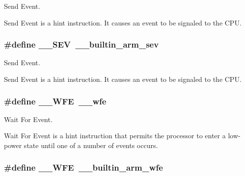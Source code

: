Send Event. 

Send Event is a hint instruction. It causes an event to be signaled to the C\-P\-U. \hypertarget{group___c_m_s_i_s___core___instruction_interface_gaab4f296d0022b4b10dc0976eb22052f9}{
\subsubsection[{\-\_\-\-\_\-\-S\-E\-V}]{\setlength{\rightskip}{0pt plus 5cm}\#define \-\_\-\-\_\-\-S\-E\-V~\-\_\-\-\_\-builtin\-\_\-arm\-\_\-sev}}\label{group___c_m_s_i_s___core___instruction_interface_gaab4f296d0022b4b10dc0976eb22052f9}


Send Event. 

Send Event is a hint instruction. It causes an event to be signaled to the C\-P\-U. \hypertarget{group___c_m_s_i_s___core___instruction_interface_gaac6cc7dd4325d9cb40d3290fa5244b3d}{
\subsubsection[{\-\_\-\-\_\-\-W\-F\-E}]{\setlength{\rightskip}{0pt plus 5cm}\#define \-\_\-\-\_\-\-W\-F\-E~\-\_\-\-\_\-wfe}}\label{group___c_m_s_i_s___core___instruction_interface_gaac6cc7dd4325d9cb40d3290fa5244b3d}


Wait For Event. 

Wait For Event is a hint instruction that permits the processor to enter a low-\/power state until one of a number of events occurs. \hypertarget{group___c_m_s_i_s___core___instruction_interface_gaac6cc7dd4325d9cb40d3290fa5244b3d}{
\subsubsection[{\-\_\-\-\_\-\-W\-F\-E}]{\setlength{\rightskip}{0pt plus 5cm}\#define \-\_\-\-\_\-\-W\-F\-E~\-\_\-\-\_\-builtin\-\_\-arm\-\_\-wfe}}\label{group___c_m_s_i_s___core___instruction_interface_gaac6cc7dd4325d9cb40d3290fa5244b3d}


